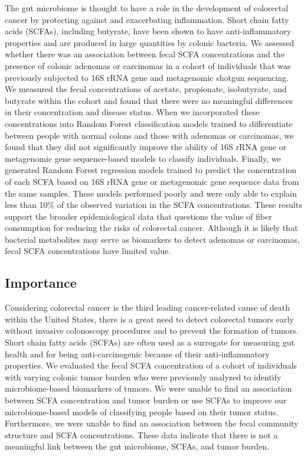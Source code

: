 \documentclass[11pt,]{article}
\begin{document}
The gut microbiome is thought to have a role in the development of
colorectal cancer by protecting against and exacerbating inflammation.
Short chain fatty acids (SCFAs), including butyrate, have been shown to
have anti-inflammatory properties and are produced in large quantities
by colonic bacteria. We assessed whether there was an association
between fecal SCFA concentrations and the presence of colonic adenomas
or carcinomas in a cohort of individuals that was previously subjected
to 16S rRNA gene and metagenomic shotgun sequencing. We measured the
fecal concentrations of acetate, propionate, isobutyrate, and butyrate
within the cohort and found that there were no meaningful differences in
their concentration and disease status. When we incorporated these
concentrations into Random Forest classification models trained to
differentiate between people with normal colons and those with adenomas
or carcinomas, we found that they did not significantly improve the
ability of 16S rRNA gene or metagenomic gene sequence-based models to
classify individuals. Finally, we generated Random Forest regression
models trained to predict the concentration of each SCFA based on 16S
rRNA gene or metagenomic gene sequence data from the same samples. These
models performed poorly and were only able to explain less than 10\% of
the observed variation in the SCFA concentrations. These results support
the broader epidemiological data that questions the value of fiber
consumption for reducing the risks of colorectal cancer. Although it is
likely that bacterial metabolites may serve as biomarkers to detect
adenomas or carcinomas, fecal SCFA concentrations have limited value.

\newpage

\hypertarget{importance}{%
\subsection{Importance}\label{importance}}

Considering colorectal cancer is the third leading cancer-related cause
of death within the United States, there is a great need to detect
colorectal tumors early without invasive colonoscopy procedures and to
prevent the formation of tumors. Short chain fatty acids (SCFAs) are
often used as a surrogate for measuring gut health and for being
anti-carcinogenic because of their anti-inflammatory properties. We
evaluated the fecal SCFA concentration of a cohort of individuals with
varying colonic tumor burden who were previously analyzed to identify
microbiome-based biomarkers of tumors. We were unable to find an
association between SCFA concentration and tumor burden or use SCFAs to
improve our microbiome-based models of classifying people based on their
tumor status. Furthermore, we were unable to find an association between
the fecal community structure and SCFA concentrations. These data
indicate that there is not a meaningful link between the gut microbiome,
SCFAs, and tumor burden.
\end{document}
